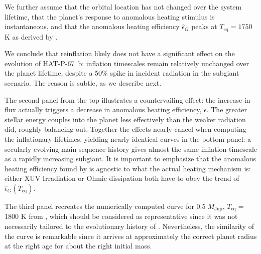 \documentclass[twocolumn]{aastex631}
\newcommand{\hatpb}{\object{HAT-P-67 b}}
\begin{document}
We further assume that the orbital location has not changed over the system lifetime, that the planet's response to anomalous heating stimulus is instantaneous, and that the anomalous heating efficiency $\hat{\epsilon}_G$ peaks at $T_\mathrm{eq}=1750$ K as derived by \citet{2018AJ....155..214T}.

We conclude that reinflation likely does not have a significant effect on the evolution of HAT-P-67~b: inflation timescales remain relatively unchanged over the planet lifetime, despite a 50\% spike in incident radiation in the subgiant scenario.  The reason is subtle, as we describe next.  

The second panel from the top illustrates a countervailing effect: the increase in flux actually triggers a decrease in anomalous heating efficiency, $\epsilon$. The greater stellar energy couples into the planet less effectively than the weaker radiation did, roughly balancing out. Together the effects nearly cancel when computing the inflationary lifetimes, yielding nearly identical curves in the bottom panel: a secularly evolving main sequence history gives almost the same inflation timescale as a rapidly increasing subgiant.  It is important to emphasize that the anomalous heating efficiency found by \citet{2018AJ....155..214T} is agnostic to what the actual heating mechanism is: either XUV Irradiation or Ohmic dissipation both have to obey the trend of $\hat{\epsilon}_G(T_\mathrm{eq})$.

The third panel recreates the numerically computed curve for $0.5\;M_\mathrm{Jup}$, $T_\mathrm{eq}=$1800 K from \citep{2011ApJ...738....1B}, which should be considered as representative since it was not necessarily tailored to the evolutionary history of \hatpb.  Nevertheless, the similarity of the curve is remarkable since it arrives at approximately the correct planet radius at the right age for about the right initial mass.
\end{document}
